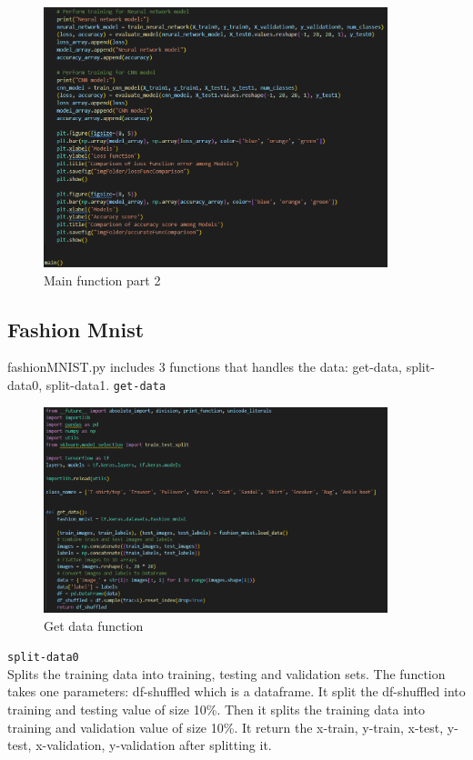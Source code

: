 \documentclass{article}
\newcommand{\code}[1]{\colorbox{light-gray}{\texttt{#1}}}
\begin{document}
\begin{figure}[H]
    \caption{Main function part 2}
    \centering
    \includegraphics[width=10cm]{../imgFolder/mainPart2.png}
\end{figure}

\subsection{Fashion Mnist}
fashionMNIST.py includes 3 functions that handles the data: get-data, split-data0, split-data1.
\code{get-data}\\\newline
\begin{figure}[H]
    \caption{Get data function}
    \centering
    \includegraphics[width=10cm]{../imgFolder/getData.png}
\end{figure}

\code{split-data0}\\
Splits the training data into training, testing and validation sets.
The function takes one parameters: df-shuffled which is a dataframe.
It split the df-shuffled into training and testing value of size 10\%.
Then it splits the training data into training and validation value of size 10\%.
It return the x-train, y-train, x-test, y-test, x-validation, y-validation after splitting it.
\end{document}
